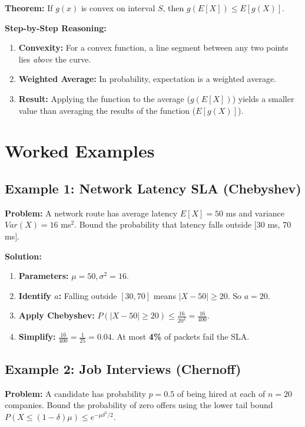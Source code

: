 \documentclass[11pt]{article}
\begin{document}
\textbf{Theorem:} If $g(x)$ is convex on interval $S$, then $g(E[X]) \le E[g(X)]$.

\textbf{Step-by-Step Reasoning:}
\begin{enumerate}
    \item \textbf{Convexity:} For a convex function, a line segment between any two points lies \textit{above} the curve.
    \item \textbf{Weighted Average:} In probability, expectation is a weighted average.
    \item \textbf{Result:} Applying the function to the average ($g(E[X])$) yields a smaller value than averaging the results of the function ($E[g(X)]$).
\end{enumerate}

\section{Worked Examples}

\subsection{Example 1: Network Latency SLA (Chebyshev)}
\textbf{Problem:} A network route has average latency $E[X] = 50$ ms and variance $Var(X) = 16$ ms$^2$. Bound the probability that latency falls outside $[30$ ms, $70$ ms$]$.

\textbf{Solution:}
\begin{enumerate}
    \item \textbf{Parameters:} $\mu = 50, \sigma^{2} = 16$.
    \item \textbf{Identify $a$:} Falling outside $[30, 70]$ means $|X - 50| \ge 20$. So $a = 20$.
    \item \textbf{Apply Chebyshev:} $P(|X - 50| \ge 20) \le \frac{16}{20^{2}} = \frac{16}{400}$.
    \item \textbf{Simplify:} $\frac{16}{400} = \frac{1}{25} = 0.04$. At most \textbf{4\%} of packets fail the SLA.
\end{enumerate}

\subsection{Example 2: Job Interviews (Chernoff)}
\textbf{Problem:} A candidate has probability $p = 0.5$ of being hired at each of $n = 20$ companies. Bound the probability of zero offers using the lower tail bound $P(X \le (1 - \delta)\mu) \le e^{-\mu\delta^{2}/2}$.
\end{document}
